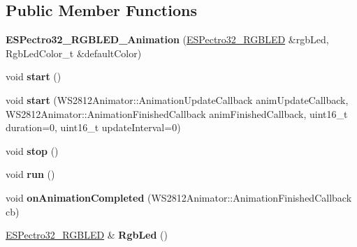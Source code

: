 \subsection*{Public Member Functions}
\begin{DoxyCompactItemize}
\item 
\hypertarget{classESPectro32__RGBLED__Animation_adb4ace9959ddce9e4c4190bc8032bf77}{{\bfseries E\-S\-Pectro32\-\_\-\-R\-G\-B\-L\-E\-D\-\_\-\-Animation} (\hyperlink{classESPectro32__RGBLED}{E\-S\-Pectro32\-\_\-\-R\-G\-B\-L\-E\-D} \&rgb\-Led, Rgb\-Led\-Color\-\_\-t \&default\-Color)}\label{classESPectro32__RGBLED__Animation_adb4ace9959ddce9e4c4190bc8032bf77}

\item 
\hypertarget{classESPectro32__RGBLED__Animation_a8558246bd40b33eb7745428bdb5d009a}{void {\bfseries start} ()}\label{classESPectro32__RGBLED__Animation_a8558246bd40b33eb7745428bdb5d009a}

\item 
\hypertarget{classESPectro32__RGBLED__Animation_aef45fc6cc0054c980befc429fc25c90f}{void {\bfseries start} (W\-S2812\-Animator\-::\-Animation\-Update\-Callback anim\-Update\-Callback, W\-S2812\-Animator\-::\-Animation\-Finished\-Callback anim\-Finished\-Callback, uint16\-\_\-t duration=0, uint16\-\_\-t update\-Interval=0)}\label{classESPectro32__RGBLED__Animation_aef45fc6cc0054c980befc429fc25c90f}

\item 
\hypertarget{classESPectro32__RGBLED__Animation_a68276cca176858f56686f5a33c69f2d9}{void {\bfseries stop} ()}\label{classESPectro32__RGBLED__Animation_a68276cca176858f56686f5a33c69f2d9}

\item 
\hypertarget{classESPectro32__RGBLED__Animation_ae67369658f71b31b53229798bc6caa52}{void {\bfseries run} ()}\label{classESPectro32__RGBLED__Animation_ae67369658f71b31b53229798bc6caa52}

\item 
\hypertarget{classESPectro32__RGBLED__Animation_a2c8384a0665c0a7f356a05438e33b375}{void {\bfseries on\-Animation\-Completed} (W\-S2812\-Animator\-::\-Animation\-Finished\-Callback cb)}\label{classESPectro32__RGBLED__Animation_a2c8384a0665c0a7f356a05438e33b375}

\item 
\hypertarget{classESPectro32__RGBLED__Animation_abafab4b15281cea8b9127520c42ff194}{\hyperlink{classESPectro32__RGBLED}{E\-S\-Pectro32\-\_\-\-R\-G\-B\-L\-E\-D} \& {\bfseries Rgb\-Led} ()}\label{classESPectro32__RGBLED__Animation_abafab4b15281cea8b9127520c42ff194}

\end{DoxyCompactItemize}
